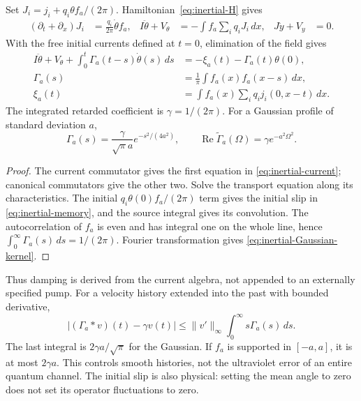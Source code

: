 \begin{proposition}
\label{prop:inertial-reaction}
Set $J_i=j_i+q_i\theta f_a/(2\pi)$. Hamiltonian~\eqref{eq:inertial-H}
gives
\begin{align}\label{eq:inertial-current}
 (\partial_t+\partial_x)J_i&=\frac{q_i}{2\pi}\dot\theta f_a,
 &I\ddot\theta+V_\theta&=-\int f_a\sum_i q_iJ_i\,dx,
 &J\ddot y+V_y&=0.
\end{align}
With the free initial currents defined at $t=0$, elimination of the
field gives
\begin{align}\label{eq:inertial-memory}
 I\ddot\theta+V_\theta+\int_0^t\Gamma_a(t-s)\dot\theta(s)\,ds
   &=-\xi_a(t)-\Gamma_a(t)\theta(0),\\
 \Gamma_a(s)&=\frac1\pi\int f_a(x)f_a(x-s)\,dx,\nonumber\\
 \xi_a(t)&=\int f_a(x)\sum_iq_i j_i(0,x-t)\,dx.\nonumber
\end{align}
The integrated retarded coefficient is $\gamma=1/(2\pi)$.
For a Gaussian profile of standard deviation $a$,
\begin{equation}\label{eq:inertial-Gaussian-kernel}
 \Gamma_a(s)=\frac{\gamma}{\sqrt\pi a}e^{-s^2/(4a^2)},
 \qquad \operatorname{Re}\widetilde\Gamma_a(\Omega)
       =\gamma e^{-a^2\Omega^2}.
\end{equation}
\end{proposition}
\begin{proof}
The current commutator gives the first equation in
\eqref{eq:inertial-current}; canonical commutators give the other two.
Solve the transport equation along its characteristics. The initial
$q_i\theta(0)f_a/(2\pi)$ term gives the initial slip in
\eqref{eq:inertial-memory}, and the source integral gives its convolution.
The autocorrelation of $f_a$ is even and has integral one on the whole
line, hence $\int_0^\infty\Gamma_a(s)\,ds=1/(2\pi)$.
Fourier transformation gives \eqref{eq:inertial-Gaussian-kernel}.
\end{proof}

Thus damping is derived from the current algebra, not appended to an
externally specified pump. For a velocity history extended into the
past with bounded derivative,
\begin{equation}\label{eq:inertial-memory-bound}
 |(\Gamma_a*v)(t)-\gamma v(t)|
 \le\|v'\|_\infty\int_0^\infty s\Gamma_a(s)\,ds.
\end{equation}
The last integral is $2\gamma a/\sqrt\pi$ for the Gaussian. If $f_a$
is supported in $[-a,a]$, it is at most $2\gamma a$. This controls
smooth histories, not the ultraviolet error of an entire quantum
channel. The initial slip is also physical: setting the mean angle
to zero does not set its operator fluctuations to zero.

